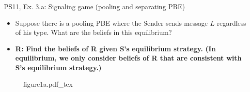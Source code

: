 \begin{frame}{PS11, Ex. 3.a: Signaling game (pooling and separating PBE)}
    \begin{itemize}
      \item[(a)] Suppose there is a pooling PBE where the Sender sends message $L$ regardless of his type. What are the beliefs in this equilibrium?
    \end{itemize} \vspace{-8pt}
    \begin{multicols}{2}
      \begin{itemize}
        \item[SR3:] \textbf{R: Find the beliefs of R given S's equilibrium strategy. (In equilibrium, we only consider beliefs of R that are consistent with S's equilibrium strategy.)}
      \end{itemize}
      \vfill\null\columnbreak
      \begin{figure}[!h]
        \center
        \def\svgwidth{\columnwidth}
        {figure1a.pdf_tex}
      \end{figure}
      \vfill\null \columnbreak
      \vfill
    \end{multicols}
\end{frame}
